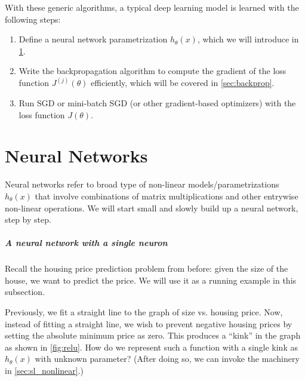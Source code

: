 With these generic algorithms, a typical deep learning model is learned
with the following steps:
\begin{enumerate} %
    \item Define a neural network parametrization $h_\theta(x)$, which we will introduce in \cref{sec:nn}.
    \item Write the backpropagation algorithm to compute the gradient of the loss function $J^{(j)}(\theta)$ efficiently, which will be covered in \cref{sec:backprop}.
    \item Run SGD or mini-batch SGD (or other gradient-based optimizers) with the loss function $J(\theta)$.
\end{enumerate}


\chapter{Neural Networks}\label{sec:nn}
Neural networks refer to broad type of non-linear models/parametrizations
$h_\theta(x)$ that involve combinations of matrix multiplications and other entrywise
non-linear operations. We will start small and slowly build up a neural
network, step by step.

\paragraph{A neural network with a single neuron} Recall the housing price
prediction problem from before: given the size of the house, we want to
predict the price. We will use it as a running example in this subsection.

Previously, we fit a straight line to the graph of size vs. housing price.
Now, instead of fitting a straight line, we wish to prevent negative housing
prices by setting the absolute minimum price as zero. This produces a ``kink''
in the graph as shown in \cref{fig:relu}. How do we represent such a function with
a single kink as $h_\theta(x)$ with unknown parameter? (After doing so, we can
invoke the machinery in \cref{sec:sl_nonlinear}.)

